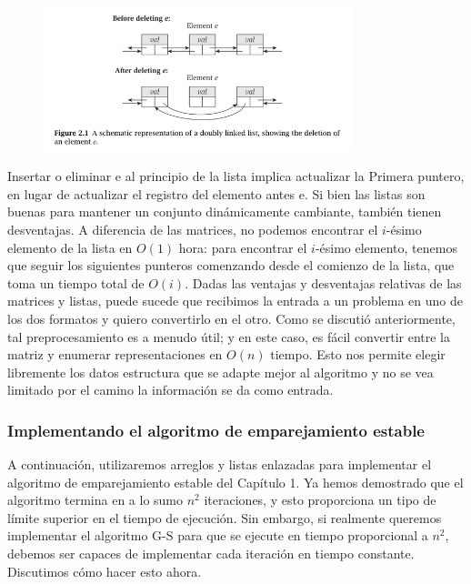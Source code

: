 \documentclass[a4paper]{article}
\begin{document}
\begin{figure}[h] 
  \centering
    \includegraphics[width=0.8\textwidth]{Imagenes-Seccion2/fig2_1.PNG}
\end{figure}


Insertar o eliminar e al principio de la lista implica actualizar la Primera
puntero, en lugar de actualizar el registro del elemento antes e.
Si bien las listas son buenas para mantener un conjunto dinámicamente cambiante, también tienen desventajas. A diferencia de las matrices, no podemos encontrar el $i$-ésimo elemento de la lista en $O(1)$ hora: para encontrar el $i$-ésimo elemento, tenemos que seguir los siguientes punteros comenzando
desde el comienzo de la lista, que toma un tiempo total de $O(i)$.
Dadas las ventajas y desventajas relativas de las matrices y listas, puede
sucede que recibimos la entrada a un problema en uno de los dos formatos y
quiero convertirlo en el otro. Como se discutió anteriormente, tal preprocesamiento es
a menudo útil; y en este caso, es fácil convertir entre la matriz y
enumerar representaciones en $O(n)$ tiempo. Esto nos permite elegir libremente los datos
estructura que se adapte mejor al algoritmo y no se vea limitado por el camino
la información se da como entrada.\\


\subsubsection*{Implementando el algoritmo de emparejamiento estable}

A continuación, utilizaremos arreglos y listas enlazadas para implementar el algoritmo de emparejamiento estable del Capítulo 1. Ya hemos demostrado que el algoritmo termina en a lo sumo $n^2$ iteraciones, y esto proporciona un tipo de límite superior en el tiempo de ejecución. Sin embargo, si realmente queremos implementar el algoritmo G-S para que se ejecute en tiempo proporcional a $n^2$, debemos ser capaces de implementar cada iteración en tiempo constante. Discutimos cómo hacer esto ahora.\\
\end{document}
